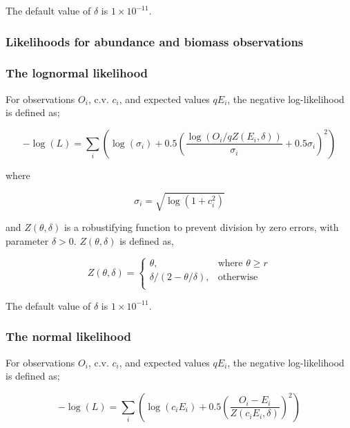 {{{{The default value of $\delta$ is $1 \times 10^{-11}$.

\subsubsection{Likelihoods for abundance and biomass observations}
\subsubsection*{The lognormal likelihood}

For observations $O_i$, c.v. $c_i$, and expected values $qE_i$, the negative log-likelihood is defined as;

\begin{equation}
- \log \left(L \right) = \sum\limits_i \left( \log \left( \sigma _i \right) + 0.5\left( \frac{\log \left(O_i / q Z \left(E_i,\delta \right) \right)}{\sigma_i} + 0.5 \sigma_i \right)^2 \right)
\end{equation}

where 

\begin{equation}
\sigma_i  = \sqrt{\log \left(1+c_i^2 \right)}
\end{equation}

and $Z \left(\theta,\delta \right)$ is a robustifying function to prevent division by zero errors, with parameter $\delta>0$. $Z \left(\theta,\delta \right)$ is defined as,

\begin{equation}
Z \left(\theta,\delta \right) = \begin{cases}
\theta, & \text{where $\theta \ge r$} \\
\delta/\left( 2-\theta/\delta \right), & \text{otherwise} \\  
\end{cases}
\end{equation}

The default value of $\delta$ is $1 \times 10^{-11}$.

\subsubsection*{The normal likelihood}

For observations $O_i$, c.v. $c_i$, and expected values $qE_i$, the negative log-likelihood is defined as;

\begin{equation}
- \log \left(L \right) = \sum\limits_i \left( \log \left( c_i E_i \right) +0.5 \left( \frac{O_i-E_i}{Z\left(c_i E_i,\delta \right)}\right)^2\right)
\end{equation}

}}}}
